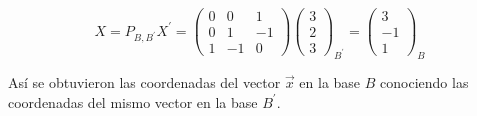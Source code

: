 \begin{example}
\bigskip

$$X=P_{B,B ^{\prime}}X^{\prime}=\left(\begin{array}{ccc} 0 & 0 &  1 \\ 0 & 1 & -1
\\ 1 & -1 & 0
\end{array}
 \right) \left(\begin{array}{c} 3 \\ 2  
\\ 3  
\end{array} \right)_{B ^{\prime}} =\left(\begin{array}{c} 3 \\ -1 
\\ 1  
\end{array} \right)_{B}$$

\bigskip

Así se obtuvieron  las coordenadas del vector $\vec{x}$ en la base  $B$ conociendo las coordenadas del mismo vector en la base $B ^{\prime}$.
\end{example}


\bigskip


\bigskip


